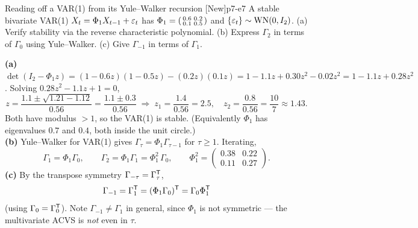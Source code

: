 \begin{exercise}{Reading off a VAR(1) from its Yule--Walker recursion \quad\textnormal{[New]}}{p7-e7}
A stable bivariate VAR(1) $X_t=\Phi_1 X_{t-1}+\varepsilon_t$ has
$\Phi_1=\begin{psmallmatrix}0.6&0.2\\0.1&0.5\end{psmallmatrix}$ and
$\{\varepsilon_t\}\sim\mathrm{WN}(0,I_2)$. (a) Verify stability via the reverse
characteristic polynomial. (b) Express $\Gamma_2$ in terms of $\Gamma_0$ using
Yule--Walker. (c) Give $\Gamma_{-1}$ in terms of $\Gamma_1$.
\end{exercise}
\begin{solution}
\textbf{(a)} $\det(I_2-\Phi_1 z)=(1-0.6z)(1-0.5z)-(0.2z)(0.1z)
=1-1.1z+0.30z^2-0.02z^2=1-1.1z+0.28z^2$. Solving $0.28z^2-1.1z+1=0$,
\[
z=\frac{1.1\pm\sqrt{1.21-1.12}}{0.56}=\frac{1.1\pm0.3}{0.56}
\;\Rightarrow\; z_1=\frac{1.4}{0.56}=2.5,\quad z_2=\frac{0.8}{0.56}=\frac{10}{7}\approx1.43 .
\]
Both have modulus $>1$, so the VAR(1) is stable. (Equivalently $\Phi_1$ has
eigenvalues $0.7$ and $0.4$, both inside the unit circle.)\\
\textbf{(b)} Yule--Walker for VAR(1) gives $\Gamma_\tau=\Phi_1\Gamma_{\tau-1}$
for $\tau\ge1$. Iterating,
\[
\Gamma_1=\Phi_1\Gamma_0,\qquad
\Gamma_2=\Phi_1\Gamma_1=\Phi_1^2\,\Gamma_0,
\qquad \Phi_1^2=\begin{pmatrix}0.38&0.22\\0.11&0.27\end{pmatrix}.
\]
\textbf{(c)} By the transpose symmetry $\Gamma_{-\tau}=\Gamma_\tau^{\mathsf{T}}$,
\[
\Gamma_{-1}=\Gamma_1^{\mathsf{T}}=(\Phi_1\Gamma_0)^{\mathsf{T}}=\Gamma_0\Phi_1^{\mathsf{T}}
\]
(using $\Gamma_0=\Gamma_0^{\mathsf{T}}$). Note $\Gamma_{-1}\ne\Gamma_1$ in general, since
$\Phi_1$ is not symmetric --- the multivariate ACVS is \emph{not} even in
$\tau$.
\end{solution}
